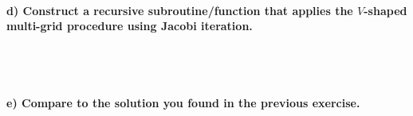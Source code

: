 \paragraph{
    d) Construct a recursive subroutine/function that applies the 
    $V$-shaped multi-grid procedure using Jacobi iteration.
} \ \\
    \\

\paragraph{
    e) Compare to the solution you found in the previous exercise.
} \ \\
    \\
